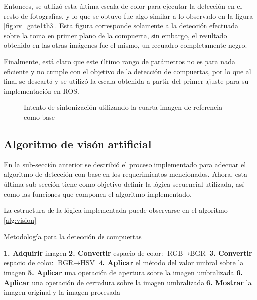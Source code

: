Entonces, se utilizó esta última escala de color para ejecutar la detección en el resto de fotografías, y lo que se obtuvo fue algo similar a lo observado en la figura \ref{fig:cv_gate1th3}. Esta figura corresponde solamente a la detección efectuada sobre la toma en primer plano de la compuerta, sin embargo, el resultado obtenido en las otras imágenes fue el mismo, un recuadro completamente negro.

Finalmente, está claro que este último rango de parámetros no es para nada eficiente y no cumple con el objetivo de la detección de compuertas, por lo que al final se descartó y se utilizó la escala obtenida a partir del primer ajuste para su implementación en ROS.

\begin{figure}[ht]
    \centering
    \hfill

    \caption{Intento de sintonización utilizando la cuarta imagen de referencia como base}
    \label{fig:cv_gatesth3}
\end{figure}

\subsection{Algoritmo de visón artificial}

En la sub-sección anterior se describió el proceso implementado para adecuar el algoritmo de detección con base en los requerimientos mencionados. Ahora, esta última sub-sección tiene como objetivo definir la lógica secuencial utilizada, así como las funciones que componen el algoritmo implementado.

La estructura de la lógica implementada puede observarse en el algoritmo \ref{alg:vision}
\begin{algorithm}
\caption{Metodología para la detección de compuertas}\label{alg:vision}
\begin{algorithmic}
\State \textbf{1. Adquirir} imagen
\State \textbf{2. Convertir }espacio de color: $\text{RGB} \to \text{BGR}$
\State \textbf{3. Convertir }espacio de color: $\text{BGR} \to \text{HSV}$
\State \textbf{4. Aplicar }el método del valor umbral sobre la imagen
\State \textbf{5. Aplicar }una operación de apertura sobre la imagen umbralizada
\State \textbf{6. Aplicar }una operación de cerradura sobre la imagen umbralizada
\State \textbf{6. Mostrar } la imagen original y la imagen procesada
\end{algorithmic}
\end{algorithm}

